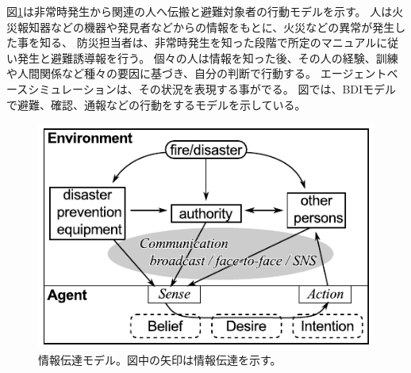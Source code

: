 \documentclass[a4j]{jarticle}
\begin{document}

図\ref{fig:evac-model}は非常時発生から関連の人へ伝搬と避難対象者の行動モデルを示す。
人は火災報知器などの機器や発見者などからの情報をもとに、火災などの異常が発生した事を知る、
防災担当者は、非常時発生を知った段階で所定のマニュアルに従い発生と避難誘導報を行う。
個々の人は情報を知った後、その人の経験、訓練や人間関係など種々の要因に基づき、自分の判断で行動する。
エージェントベースシミュレーションは、その状況を表現する事がでる。
図では、BDIモデルで避難、確認、通報などの行動をするモデルを示している。
\begin{figure}[h]
\centering
\includegraphics{fig/info-model.pdf}
\caption{情報伝達モデル。図中の矢印は情報伝達を示す。}
\label{fig:evac-model}
\end{figure}
\end{document}
